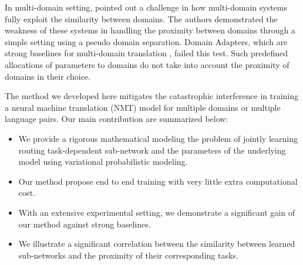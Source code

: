 \documentclass[11pt]{article}
\begin{document}
In multi-domain setting, \citet{Pham21revisiting} pointed out a challenge in how multi-domain systems fully exploit the similarity between domains. The authors demonstrated the weakness of these systems in handling the proximity between domains through a simple setting using a pseudo domain separation. Domain Adapters, which are strong baselines for multi-domain translation \cite{Pham20Study}, failed this test. Such predefined allocations of parameters to domains do not take into account the proximity of domains in their choice.

The method we developed here mitigates the catastrophic interference in training a neural machine translation (NMT) model for multiple domains or multiple language pairs. Our main contribution are summarized below:
\begin{itemize}
\setlength{\itemsep}{1pt}
  \setlength{\parskip}{0pt}
  \setlength{\parsep}{0pt}
	\item We provide a rigorous mathematical modeling the problem of jointly learning routing task-dependent sub-network and the parameters of the underlying model using variational probabilistic modeling.
	\item Our method propose end to end training with very little extra computational cost.
	\item With an extensive experimental setting, we demonstrate a significant gain of our method against strong baselines.
	\item We illustrate a significant correlation between the similarity between learned sub-networks and the proximity of their corresponding tasks.
\end{itemize}
\end{document}
